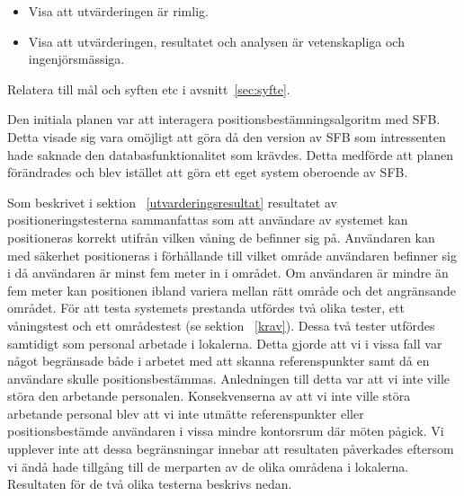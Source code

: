 \documentclass[a4paper,12pt]{article}
\begin{document}
 \begin{itemize}
 \item Visa att utvärderingen är rimlig.
 \item Visa att utvärderingen, resultatet och analysen är vetenskapliga och ingenjörsmässiga.
 \end{itemize}

 Relatera till mål och syften etc i avsnitt~\ref{sec:syfte}.
 \fi

 Den initiala planen var att interagera positionsbestämningsalgoritm med SFB. Detta visade sig vara omöjligt att göra då den version av SFB som intressenten hade saknade den databasfunktionalitet som krävdes. Detta medförde att planen förändrades och blev istället att göra ett eget system oberoende av SFB.

 Som beskrivet i sektion ~\ref{utvarderingsresultat} resultatet av positioneringstesterna sammanfattas som att användare av systemet kan positioneras korrekt utifrån vilken våning de befinner sig på. Användaren kan med säkerhet positioneras i förhållande till vilket område användaren befinner sig i då användaren är minst fem meter in i området. Om användaren är mindre än fem meter kan positionen ibland variera mellan rätt område och det angränsande området.
 För att testa systemets prestanda utfördes två olika tester, ett våningstest och ett områdestest (se sektion ~\ref{krav}). Dessa två tester utfördes samtidigt som personal arbetade i lokalerna. Detta gjorde att vi i vissa fall var något begränsade både i arbetet med att skanna referenspunkter samt då en användare skulle positionsbestämmas. Anledningen till detta var att vi inte ville störa den arbetande personalen. Konsekvenserna av att vi inte ville störa arbetande personal blev att vi inte utmätte referenspunkter eller positionsbestämde användaren i vissa mindre kontorsrum där möten pågick. Vi upplever inte att dessa begränsningar innebar att resultaten påverkades eftersom vi ändå hade tillgång till de merparten av de olika områdena i lokalerna. Resultaten för de två olika testerna beskrivs nedan.
\end{document}
